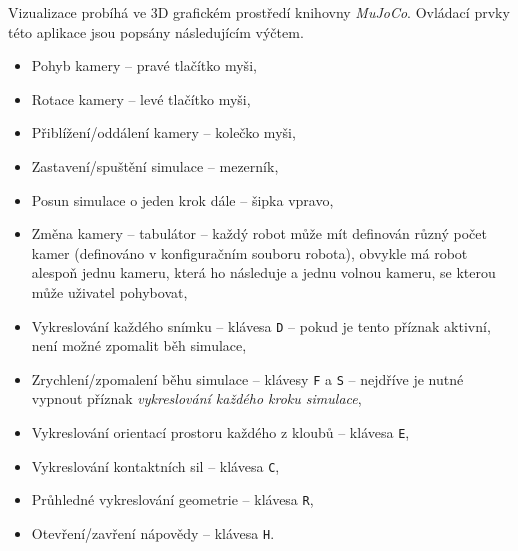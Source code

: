 Vizualizace probíhá ve 3D grafickém prostředí knihovny \emph{MuJoCo}. Ovládací
prvky této aplikace jsou popsány následujícím výčtem.

\begin{itemize}
    \item Pohyb kamery -- pravé tlačítko myši,
    \item Rotace kamery -- levé tlačítko myši,
    \item Přiblížení/oddálení kamery -- kolečko myši,
    \item Zastavení/spuštění simulace -- mezerník,
    \item Posun simulace o jeden krok dále -- šipka vpravo,
    \item Změna kamery -- tabulátor -- každý robot může mít definován různý počet
        kamer (definováno v konfiguračním souboru robota), obvykle má robot
        alespoň jednu kameru, která ho následuje a jednu volnou kameru, se
        kterou může uživatel pohybovat,
    \item Vykreslování každého snímku -- klávesa \texttt{D} -- pokud je tento
        příznak aktivní, není možné zpomalit běh simulace,
    \item Zrychlení/zpomalení běhu simulace -- klávesy \texttt{F} a \texttt{S}
        -- nejdříve je nutné vypnout příznak \emph{vykreslování každého kroku
        simulace},
    \item Vykreslování orientací prostoru každého z kloubů -- klávesa \texttt{E},
    \item Vykreslování kontaktních sil -- klávesa \texttt{C},
    \item Průhledné vykreslování geometrie -- klávesa \texttt{R},
    \item Otevření/zavření nápovědy -- klávesa \texttt{H}.
\end{itemize}

